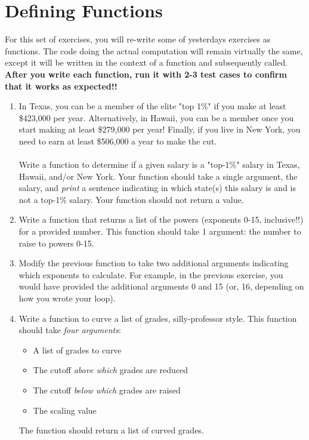 \documentclass{article}[12pt]
\begin{document}
\section{Defining Functions}

For this set of exercises, you will re-write some of yesterday\textquotesingle s exercises as functions. The code doing the actual computation will remain virtually the same, except it will be written in the context of a function and subsequently called. \textbf{ After you write each function, run it with 2-3 test cases to confirm that it works as expected!!}

\begin{enumerate}

	\item In Texas, you can be a member of the elite "top 1\%" if you make at least \$423,000 per year. Alternatively, in Hawaii, you can be a member once you start making at least \$279,000 per year! Finally, if you live in New York, you need to earn at least \$506,000 a year to make the cut. \\\\ Write a function to determine if a given salary is a "top-1\%" salary in Texas, Hawaii, and/or New York. Your function should take a single argument, the salary, and \emph{print} a sentence indicating in which state(s) this salary is and is not a top-1\% salary. Your function should not return a value.
	
	\item Write a function that returns a list of the powers (exponents 0-15, inclusive!!) for a provided number. This function should take 1 argument: the number to raise to powers 0-15.
	
	\item Modify the previous function to take two additional arguments indicating which exponents to calculate. For example, in the previous exercise, you would have provided the additional arguments 0 and 15 (or, 16, depending on how you wrote your loop). 
	
	\item Write a function to curve a list of grades, silly-professor style. This function should take \emph{four arguments}:
	\begin{itemize}
		\item A list of grades to curve
		\item The cutoff \emph{above which} grades are reduced
		\item The cutoff \emph{below which} grades are raised
		\item The scaling value
	\end{itemize}
	The function should return a list of curved grades. 
	

\end{enumerate}
\end{document}
